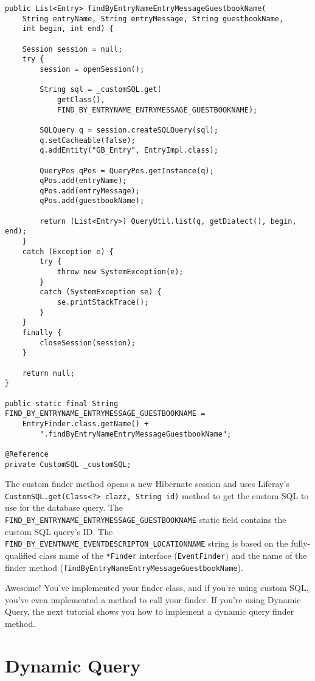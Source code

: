 \begin{verbatim}
public List<Entry> findByEntryNameEntryMessageGuestbookName(
    String entryName, String entryMessage, String guestbookName,
    int begin, int end) {

    Session session = null;
    try {
        session = openSession();

        String sql = _customSQL.get(
            getClass(),
            FIND_BY_ENTRYNAME_ENTRYMESSAGE_GUESTBOOKNAME);

        SQLQuery q = session.createSQLQuery(sql);
        q.setCacheable(false);
        q.addEntity("GB_Entry", EntryImpl.class);

        QueryPos qPos = QueryPos.getInstance(q);
        qPos.add(entryName);
        qPos.add(entryMessage);
        qPos.add(guestbookName);

        return (List<Entry>) QueryUtil.list(q, getDialect(), begin, end);
    }
    catch (Exception e) {
        try {
            throw new SystemException(e);
        }
        catch (SystemException se) {
            se.printStackTrace();
        }
    }
    finally {
        closeSession(session);
    }

    return null;
}

public static final String FIND_BY_ENTRYNAME_ENTRYMESSAGE_GUESTBOOKNAME =
    EntryFinder.class.getName() +
        ".findByEntryNameEntryMessageGuestbookName";

@Reference
private CustomSQL _customSQL;
\end{verbatim}

The custom finder method opens a new Hibernate session and uses
Liferay's
\texttt{CustomSQL.get(Class\textless{}?\textgreater{}\ clazz,\ String\ id)}
method to get the custom SQL to use for the database query. The
\texttt{FIND\_BY\_ENTRYNAME\_ENTRYMESSAGE\_GUESTBOOKNAME} static field
contains the custom SQL query's ID. The
\texttt{FIND\_BY\_EVENTNAME\_EVENTDESCRIPTON\_LOCATIONNAME} string is
based on the fully-qualified class name of the \texttt{*Finder}
interface (\texttt{EventFinder}) and the name of the finder method
(\texttt{findByEntryNameEntryMessageGuestbookName}).

Awesome! You've implemented your finder class, and if you're using
custom SQL, you've even implemented a method to call your finder. If
you're using Dynamic Query, the next tutorial shows you how to implement
a dynamic query finder method.

\chapter{Dynamic Query}\label{dynamic-query}

